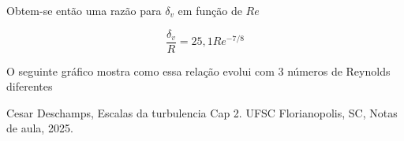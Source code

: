 \documentclass[12pt]{article}
\begin{document}
Obtem-se então uma razão para $\delta_v$ em função de $Re$

\begin{equation}
	\frac{\delta_v}{R} = 25,1 Re^{-7/8}
\end{equation}

O seguinte gráfico mostra como essa relação evolui com 3 números de Reynolds diferentes

 

\begin{thebibliography}{999}
	
	
	Cesar Deschamps,
	Escalas da turbulencia Cap 2.
	UFSC Florianopolis, SC,
	Notas de aula,
	2025.
		
	
\end{thebibliography}
\end{document}
